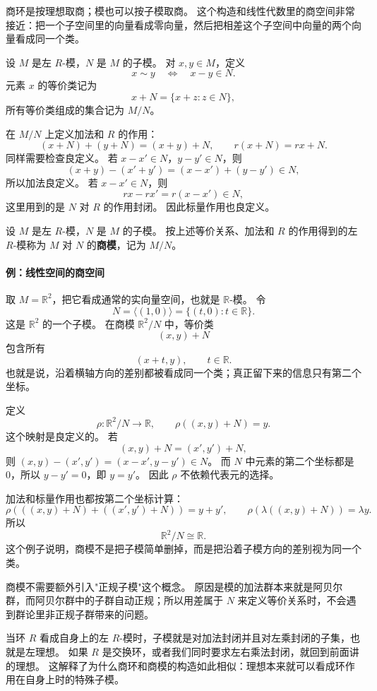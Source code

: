 商环是按理想取商；模也可以按子模取商。
这个构造和线性代数里的商空间非常接近：把一个子空间里的向量看成零向量，然后把相差这个子空间中向量的两个向量看成同一个类。

设 $M$ 是左 $R$-模，$N$ 是 $M$ 的子模。
对 $x,y\in M$，定义
\[
x\sim y \quad\Longleftrightarrow\quad x-y\in N.
\]
元素 $x$ 的等价类记为
\[
x+N=\{x+z:z\in N\},
\]
所有等价类组成的集合记为 $M/N$。

在 $M/N$ 上定义加法和 $R$ 的作用：
\[
(x+N)+(y+N)=(x+y)+N,
\qquad
r(x+N)=rx+N.
\]
同样需要检查良定义。
若 $x-x'\in N$，$y-y'\in N$，则
\[
(x+y)-(x'+y')=(x-x')+(y-y')\in N,
\]
所以加法良定义。
若 $x-x'\in N$，则
\[
rx-rx'=r(x-x')\in N,
\]
这里用到的是 $N$ 对 $R$ 的作用封闭。
因此标量作用也良定义。

\begin{definition}[商模]\label{def:quotient-module}
设 $M$ 是左 $R$-模，$N$ 是 $M$ 的子模。
按上述等价关系、加法和 $R$ 的作用得到的左 $R$-模称为 $M$ 对 $N$ 的\textbf{商模}，记为 $M/N$。
\end{definition}

\paragraph*{例：线性空间的商空间}\label{ex:quotient-vector-space}
取 $M=\mathbb R^2$，把它看成通常的实向量空间，也就是 $\mathbb R$-模。
令
\[
N=\langle(1,0)\rangle=\{(t,0):t\in\mathbb R\}.
\]
这是 $\mathbb R^2$ 的一个子模。
在商模 $\mathbb R^2/N$ 中，等价类
\[
(x,y)+N
\]
包含所有
\[
(x+t,y),\qquad t\in\mathbb R.
\]
也就是说，沿着横轴方向的差别都被看成同一个类；真正留下来的信息只有第二个坐标。

定义
\[
\rho:\mathbb R^2/N\to\mathbb R,\qquad \rho((x,y)+N)=y.
\]
这个映射是良定义的。
若
\[
(x,y)+N=(x',y')+N,
\]
则 $(x,y)-(x',y')=(x-x',y-y')\in N$。
而 $N$ 中元素的第二个坐标都是 $0$，所以 $y-y'=0$，即 $y=y'$。
因此 $\rho$ 不依赖代表元的选择。

加法和标量作用也都按第二个坐标计算：
\[
\rho(((x,y)+N)+((x',y')+N))=y+y',
\qquad
\rho(\lambda((x,y)+N))=\lambda y.
\]
所以
\[
\mathbb R^2/N\cong\mathbb R.
\]
这个例子说明，商模不是把子模简单删掉，而是把沿着子模方向的差别视为同一个类。

商模不需要额外引入"正规子模"这个概念。
原因是模的加法群本来就是阿贝尔群，而阿贝尔群中的子群自动正规；所以用差属于 $N$ 来定义等价关系时，不会遇到群论里非正规子群带来的问题。

当环 $R$ 看成自身上的左 $R$-模时，子模就是对加法封闭并且对左乘封闭的子集，也就是左理想。
如果 $R$ 是交换环，或者我们同时要求左右乘法封闭，就回到前面讲的理想。
这解释了为什么商环和商模的构造如此相似：理想本来就可以看成环作用在自身上时的特殊子模。

